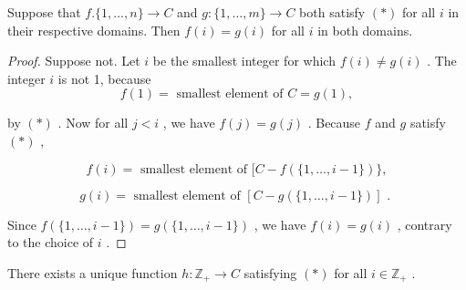 \begin{lemma} Suppose that \(f.\{ 1,\ldots ,n\}  \rightarrow  C\) and \(g : \{ 1,\ldots ,m\}  \rightarrow  C\) both satisfy \(\left( *\right)\) for all \(i\) in their respective domains. Then \(f\left( i\right)  = g\left( i\right)\) for all \(i\) in both domains.
\end{lemma}

\begin{proof}Suppose not. Let \(i\) be the smallest integer for which \(f\left( i\right)  \neq  g\left( i\right)\) . The integer \(i\) is not 1, because
\[
f\left( 1\right)  = \text{ smallest element of }C = g\left( 1\right) ,
\]

by \(\left( *\right)\) . Now for all \(j < i\) , we have \(f\left( j\right)  = g\left( j\right)\) . Because \(f\) and \(g\) satisfy \(\left( *\right)\) ,

\[
f\left( i\right)  = \text{ smallest element of }\lbrack C - f\left( {\{ 1,\ldots ,i - 1\} }\right) \} ,
\]

\[
g\left( i\right)  = \text{ smallest element of }\left\lbrack  {C - g\left( {\{ 1,\ldots ,i - 1\} }\right) }\right\rbrack  \text{ . }
\]

Since \(f\left( {\{ 1,\ldots ,i - 1\} }\right)  = g\left( {\{ 1,\ldots ,i - 1\} }\right)\) , we have \(f\left( i\right)  = g\left( i\right)\) , contrary to the choice of \(i\) .
\end{proof}
\begin{theorem} There exists a unique function \(h : {\mathbb{Z}}_{ + } \rightarrow  C\) satisfying \(\left( *\right)\) for all \(i \in  {\mathbb{Z}}_{ + }\) .
\end{theorem}

